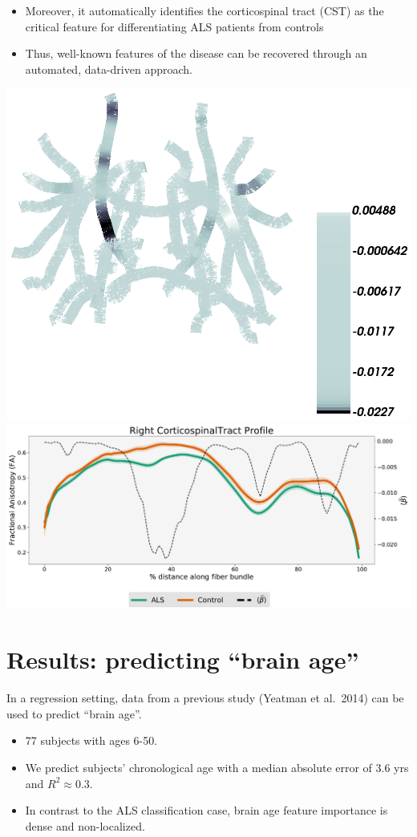 \documentclass[a0, landscape]{a0poster}
\newenvironment{Figure}
  {\par\medskip\noindent\minipage{\linewidth}}
  {\endminipage\par\medskip}
\begin{document}
\begin{multicols}{3}
\begin{itemize}
\item Moreover, it automatically identifies the corticospinal tract (CST) as the critical feature for differentiating ALS patients from controls
\item Thus, well-known features of the disease can be recovered through an automated, data-driven approach.
\end{itemize}

\begin{Figure}
    \centering
    \includegraphics[width=0.30\linewidth, valign=m]{classification_beta_bone.png}
    \includegraphics[width=0.55\linewidth, valign=m]{classification_tract_profiles.pdf}
\end{Figure}

\vspace{-1.25em}
\section*{Results: predicting ``brain age''}

\noindent In a regression setting, data from a previous study (Yeatman et al.~2014) can be used to predict ``brain age''.
\begin{itemize}
    \item 77 subjects with ages 6-50.
    \item We predict subjects' chronological age with a median absolute error of 3.6 yrs and $R^2 \approx 0.3$.
    \item In contrast to the ALS classification case, brain age feature importance is dense and non-localized.
\end{itemize}


\end{multicols}
\end{document}

